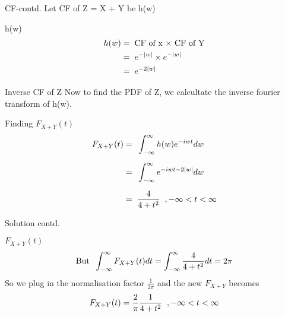 \documentclass{beamer}
\providecommand{\abs}[1]{\vert#1\vert}
\begin{document}
\begin{frame}{CF-contd.}
  Let CF of Z = X + Y be h(w)
  \begin{block}{h(w)}
    \begin{align}
      h(w) = & \hspace{0.2cm} \text{CF of x $\times$ CF of Y}  \\
      =      & \hspace{0.2cm} e^{-\abs{w}} \times e^{-\abs{w}} \\
      =      & \hspace{0.2cm} {e}^{-2\abs{w}}
    \end{align}
  \end{block}
\end{frame}

\begin{frame}{Inverse CF of Z}
  Now to find the PDF of Z, we calcultate the inverse fourier transform of h(w).
  \begin{block}{Finding $F_{X+Y}(t)$}
    \begin{align}
      F_{X+Y}(t) =\hspace{0.2cm} & \int_{-\infty}^{\infty} h(w) {e}^{-iwt} dw           \\[0.2cm]
      =\hspace{0.2cm}            & \int_{-\infty}^{\infty} {e}^{-iwt-2\abs{w}} dw       \\[0.2cm]
      =\hspace{0.2cm}            & \frac{4}{4 + {t}^2} \hspace{0.2cm}, -\infty<t<\infty
    \end{align}
  \end{block}
\end{frame}
\begin{frame}{Solution contd.}
  \begin{block}{$F_{X+Y}(t)$}
    \begin{align}
      \text{But}\hspace{0.2cm} \int_{-\infty}^{\infty} F_{X+Y}(t) dt = \int_{-\infty}^{\infty} \frac{4}{4+{t^2}} dt= 2\pi
    \end{align}
    So we plug in the normalisation factor $\displaystyle\frac{1}{2\pi}$ and the new $F_{X+Y}$ becomes
    \begin{align}
      F_{X+Y}(t) = \frac{2}{\pi} \frac{1}{4+{t}^2}\hspace{0.2cm}, -\infty<t<\infty
    \end{align}
  \end{block}
\end{frame}
\end{document}
